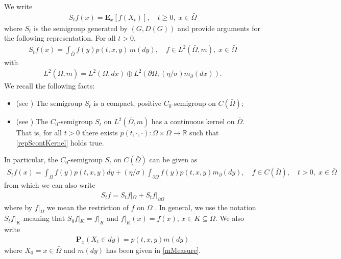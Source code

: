\documentclass[11pt,a4paper]{article}
\begin{document}
We write
\begin{align*}
S_t f(x)=\mathbf{E}_x[f(X_t)], \quad t\geq 0,\; x \in \bar{\Omega}
\end{align*}
where $S_t$ is the semigroup generated by $(G, D(G))$ and provide arguments for the following representation. For all $t>0$,
\begin{align}
S_t f(x) = \int_{\bar{\Omega}} f(y) p(t,x,y)\, m(dy), \quad f \in L^2(\bar{\Omega}, m),\; x \in \bar{\Omega}
\label{repScontKernel}
\end{align}
with
\begin{align*}
L^2(\bar{\Omega}, m) = L^2(\Omega, dx) \oplus L^2(\partial \Omega, (\eta/\sigma)m_\partial(dx)).
\end{align*}
We recall the following facts:
\begin{itemize}
\item[{\bf S1:}] (see \cite{AMPR03}) The semigroup $S_t$ is a compact, positive $C_0$-semigroup on $C(\bar{\Omega})$;
\item[{\bf S2:}] (see \cite{ArendtSauter2022}) The $C_0$-semigroup $S_t$ on $L^2(\bar{\Omega},m)$ has a continuous kernel on $\bar{\Omega}$. That is, for all $t>0$ there exists $p(t, \cdot, \cdot): \bar{\Omega} \times \bar{\Omega} \to \mathbb{R}$ such that \eqref{repScontKernel} holds true.
\end{itemize} 
In particular, the $C_0$-semigroup $S_t$ on $C(\bar{\Omega})$ can be given as 
\begin{align*}
S_tf(x) = \int_\Omega f(y) p(t,x,y) dy + (\eta / \sigma) \int_{\partial \Omega} f(y) p(t,x,y) m_\partial (dy), \quad f \in C(\bar{\Omega}), \quad t>0,\; x \in \bar{\Omega}
\end{align*}
from which we can also write
\begin{align*}
S_t f = S_t f|_{\Omega} + S_t f|_{\partial \Omega}
\end{align*}
where by $f|_\Omega$ we mean the restriction of $f$ on $\Omega$ . In general, we use the notation $S_t f|_{K}$ meaning that $S_0 f|_{K} = f|_{K}$ and $f|_{K}(x) = f(x)$, $x \in K \subseteq \bar{\Omega}$. We also write 
\begin{align*}
\mathbf{P}_x(X_t \in dy) = p(t,x,y)m(dy)
\end{align*}
where $X_0=x \in \bar{\Omega}$ and $m(dy)$ has been given in \eqref{mMeasure}.
\end{document}
